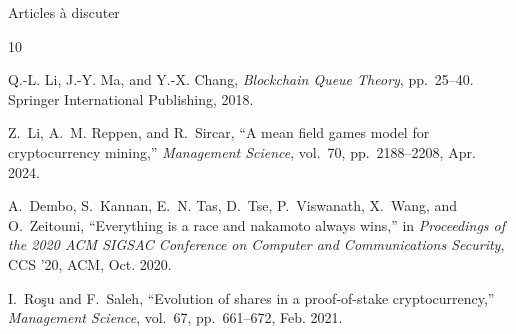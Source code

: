 \documentclass{beamer}
\begin{document}
\begin{frame}{Articles à discuter}
\scriptsize
\begin{thebibliography}{10}

Q.-L. Li, J.-Y. Ma, and Y.-X. Chang, {\em Blockchain Queue Theory}, pp.~25--40.
\newblock Springer International Publishing, 2018.




Z.~Li, A.~M. Reppen, and R.~Sircar, ``A mean field games model for
  cryptocurrency mining,'' {\em Management Science}, vol.~70, pp.~2188--2208,
  Apr. 2024.



A.~Dembo, S.~Kannan, E.~N. Tas, D.~Tse, P.~Viswanath, X.~Wang, and O.~Zeitouni,
  ``Everything is a race and nakamoto always wins,'' in {\em Proceedings of the
  2020 ACM SIGSAC Conference on Computer and Communications Security}, CCS
  ’20, ACM, Oct. 2020.


I.~Roşu and F.~Saleh, ``Evolution of shares in a proof-of-stake
  cryptocurrency,'' {\em Management Science}, vol.~67, pp.~661--672, Feb. 2021.
  

\end{thebibliography}
\end{frame}
\end{document}
